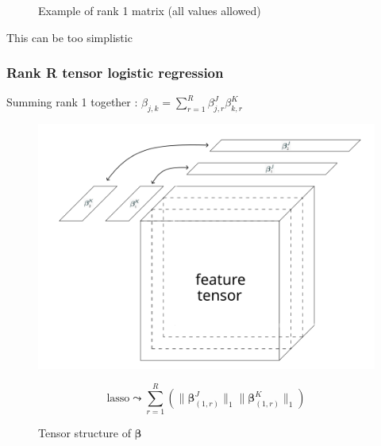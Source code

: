 \documentclass{beamer}
\begin{document}
\begin{frame}
\begin{figure}
\begin{minipage}{0.4\textwidth}
            \caption{\centering Example of rank 1 matrix (all values allowed)}
        \end{minipage}
    \end{figure}
    \begin{center}
        \vspace{5 pt}
        This can be too simplistic
    \end{center}


\end{frame}

\begin{frame}
    \frametitle{Rank R tensor logistic regression \cite{multi_rank_r}}
    \hspace{50 pt}Summing rank 1 together : $\beta_{j,k} = \sum\limits_{r = 1}^R \beta_{j,r}^J\beta_{k,r}^K$\\
    \vspace{-10 pt}
\begin{figure}
    \centering
    \begin{minipage}{0.5\textwidth}
        \centering
        \includegraphics[scale=0.25]{images/beta_tens_R.png}
        \caption{Tensor structure of $\bm{\beta}$}
    \end{minipage}
    \hfill
    \begin{minipage}{0.45\textwidth}
        \centering
        \[
        \text{lasso} \leadsto  \sum\limits_{r = 1}^R \left( \lVert \bm{\beta}_{(1,r)}^J \rVert_1 \lVert \bm{\beta}_{(1,r)}^K \rVert_1 \right)
        \]
    \end{minipage}
\end{figure}
\end{frame}
\end{document}
